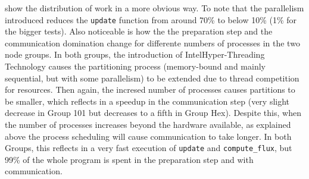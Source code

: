  show the distribution of work in a more obvious way. To note that the parallelism introduced reduces the \texttt{update} function from around 70\% to below 10\% (1\% for the bigger tests). Also noticeable is how the the preparation step and the communication domination change for differente numbers of processes in the two node groups. In both groups, the introduction of Intel\textregistered Hyper-Threading Technology causes the partitioning process (memory-bound and mainly sequential, but with some parallelism) to be extended due to thread competition for resources. Then again, the incresed number of processes causes partitions to be smaller, which reflects in a speedup in the communication step (very slight decrease in Group 101 but decreases to a fifth in Group Hex). Despite this, when the number of processes increases beyond the hardware available, as explained above the process scheduling will cause communication to take longer. In both Groups, this reflects in a very fast execution of \texttt{update} and \texttt{compute\_flux}, but 99\% of the whole program is spent in the preparation step and with communication.

